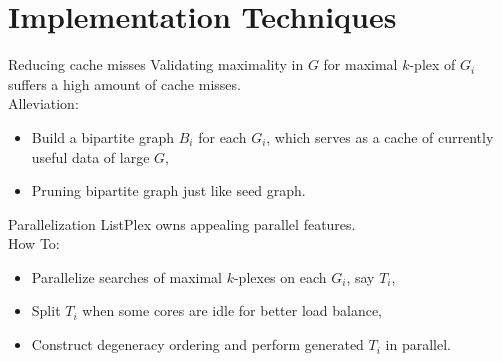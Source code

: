 \documentclass[9pt]{beamer} %
\begin{document}
\section{Implementation Techniques}
\begin{frame}{Reducing cache misses}
    Validating maximality in $G$ for maximal $k$-plex of $G_i$ suffers a high amount of cache misses.\\
    \vspace{0.5cm}
    Alleviation:\\
    \begin{itemize}
    \item Build a bipartite graph $B_i$ for each $G_i$, which serves as a cache of currently useful data of large $G$,
    \item Pruning bipartite graph just like seed graph.
    \end{itemize}
\end{frame}
\begin{frame}{Parallelization}
    ListPlex owns appealing parallel features.\\
    \vspace{0.5cm}
    How To:\\
    \begin{itemize}
        \item Parallelize searches of maximal $k$-plexes on each $G_i$, say $T_i$,
        \item Split $T_i$ when some cores are idle for better load balance,
        \item Construct degeneracy ordering and perform generated $T_i$ in parallel. 
    \end{itemize}
\end{frame}
\end{document}
